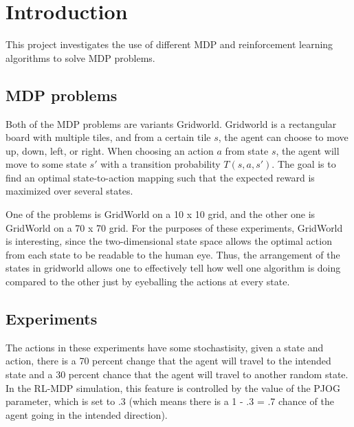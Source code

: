 \documentclass[11pt]{article}
\begin{document}
        \section{Introduction}
            
            This project investigates the use of different MDP and reinforcement learning
            algorithms to solve MDP problems.

            \subsection{MDP problems}

            Both of the MDP problems are variants Gridworld. Gridworld is a rectangular board
            with multiple tiles, and from a certain tile $s$, the agent can choose to move
            up, down, left, or right. When choosing an action $a$ from state $s$, the agent
            will move to some state $s'$ with a transition probability $T(s, a, s')$. The
            goal is to find an optimal state-to-action mapping such that the expected reward
            is maximized over several states.
            
            One of the problems is GridWorld on a 10 x 10 grid, and the other one is
            GridWorld on a 70 x 70 grid. For the purposes of these experiments, %
            GridWorld is interesting, since the two-dimensional state space allows the
            optimal action from each state to be readable to the human eye. Thus,
            the arrangement of the states in gridworld allows one to effectively tell
            how well one algorithm is doing compared to the other just by eyeballing the
            actions at every state.
            
            


            \subsection{Experiments}
            
            The actions in these experiments have some stochastisity, given a state and action, there is a 70 percent change
            that the agent will travel to the intended state and a 30 percent chance that the agent will travel to another
            random state. In the RL-MDP simulation, this feature is controlled by the value of the PJOG parameter,
            which is set to .3 (which means there is a 1 - .3 = .7
            chance of the agent going in the intended direction).
\end{document}
